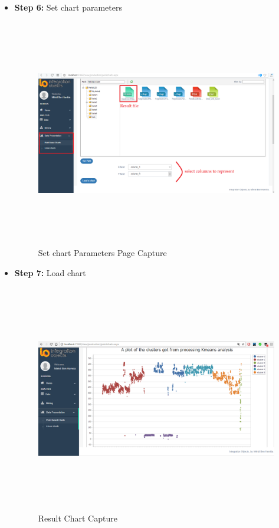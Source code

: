 \begin{appendix}
\begin{itemize}
\item \textbf{Step 6:} Set chart parameters\\

\begin{figure}[!ht]
\begin{center}
\includegraphics[width=17cm,height=10cm]{chapter5/kc1.png}
\end{center}
\caption{Set chart Parameters Page Capture}
\label{s3}
\end{figure} 


\item \textbf{Step 7:} Load chart\\


\begin{figure}[!ht]
\begin{center}
\includegraphics[width=17cm,height=10cm]{chapter5/kmeans.png}
\end{center}
\caption{Result Chart Capture}
\label{k}
\end{figure} 



\end{itemize}
\end{appendix}
